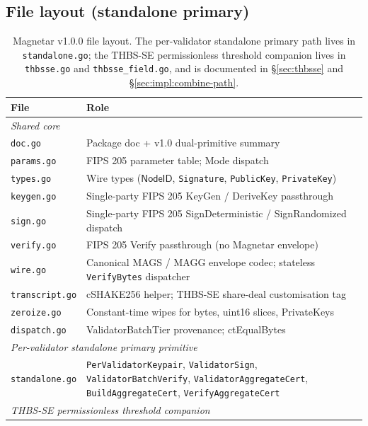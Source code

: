 \subsection{File layout (standalone primary)}
\label{sec:impl:layout}

\begin{table}[H]
\centering
\caption{Magnetar v1.0.0 file layout. The per-validator standalone
primary path lives in \texttt{standalone.go}; the THBS-SE
permissionless threshold companion lives in \texttt{thbsse.go} and
\texttt{thbsse\_field.go}, and is documented in
\S\ref{sec:thbsse} and \S\ref{sec:impl:combine-path}.}
\label{tab:magnetar-files-standalone}
\begin{tabular}{lp{8cm}}
\toprule
File & Role \\
\midrule
\multicolumn{2}{l}{\emph{Shared core}} \\
\midrule
\texttt{doc.go}            & Package doc + v1.0 dual-primitive summary \\
\texttt{params.go}         & FIPS 205 parameter table; Mode dispatch \\
\texttt{types.go}          & Wire types ($\mathsf{NodeID}$, \texttt{Signature}, \texttt{PublicKey}, \texttt{PrivateKey}) \\
\texttt{keygen.go}         & Single-party FIPS 205 KeyGen / DeriveKey passthrough \\
\texttt{sign.go}           & Single-party FIPS 205 SignDeterministic / SignRandomized dispatch \\
\texttt{verify.go}         & FIPS 205 Verify passthrough (no Magnetar envelope) \\
\texttt{wire.go}           & Canonical MAGS / MAGG envelope codec; stateless \texttt{VerifyBytes} dispatcher \\
\texttt{transcript.go}     & cSHAKE256 helper; THBS-SE share-deal customisation tag \\
\texttt{zeroize.go}        & Constant-time wipes for bytes, uint16 slices, PrivateKeys \\
\texttt{dispatch.go}       & ValidatorBatchTier provenance; ctEqualBytes \\
\midrule
\multicolumn{2}{l}{\emph{Per-validator standalone primary primitive}} \\
\midrule
\texttt{standalone.go}     & \texttt{PerValidatorKeypair}, \texttt{ValidatorSign}, \texttt{ValidatorBatchVerify}, \texttt{ValidatorAggregateCert}, \texttt{BuildAggregateCert}, \texttt{VerifyAggregateCert} \\
\midrule
\multicolumn{2}{l}{\emph{THBS-SE permissionless threshold companion}} \\

\end{tabular}
\end{table}

